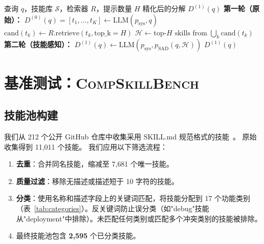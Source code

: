 \documentclass[11pt,a4paper]{ctexart}
\newcommand{\benchmark}{\textsc{CompSkillBench}}
\begin{document}
\begin{algorithm}[t]
\caption{技能感知分解（SAD）}
\label{alg:sad}
\small
\begin{algorithmic}[1]
\REQUIRE 查询 $q$，技能库 $\mathcal{S}$，检索器 $R$，提示数量 $H$
\ENSURE 精化后的分解 $D^{(1)}(q)$
\STATE \textbf{第一轮（原始）：} $D^{(0)}(q) = [t_1, \ldots, t_K] \gets \text{LLM}(p_{\text{sys}}, q)$
  \STATE $\text{cand}(t_k) \gets R.\text{retrieve}(t_k, \text{top\_k}{=}H)$
\ENDFOR
\STATE $\mathcal{H} \gets \text{top-}H\text{ skills from } \bigcup_k \text{cand}(t_k)$
\STATE \textbf{第二轮（技能感知）：} $D^{(1)}(q) \gets \text{LLM}(p_{\text{sys}}, p_{\text{SAD}}(q, \mathcal{H}))$
\RETURN $D^{(1)}(q)$
\end{algorithmic}
\end{algorithm}

\section{基准测试：\benchmark{}}
\label{sec:benchmark}

\subsection{技能池构建}

我们从 212 个公开 GitHub 仓库中收集采用 SKILL.md 规范格式的技能~\citep{anthropic2025skills}。
原始收集得到 11{,}011 个技能。
我们应用以下筛选流程：

\begin{enumerate}[nosep,leftmargin=*]
  \item \textbf{去重}：合并同名技能，缩减至 7{,}681 个唯一技能。
  \item \textbf{质量过滤}：移除无描述或描述短于 10 字符的技能。
  \item \textbf{分类}：使用名称和描述字段上的关键词匹配，将技能分配到 17 个功能类别（表~\ref{tab:categories}）。反关键词防止误分类（如"debug"技能从"deployment"中排除）。未匹配任何类别或匹配多个冲突类别的技能被排除。
  \item 最终技能池包含 \textbf{2{,}595} 个已分类技能。
\end{enumerate}
\end{document}
